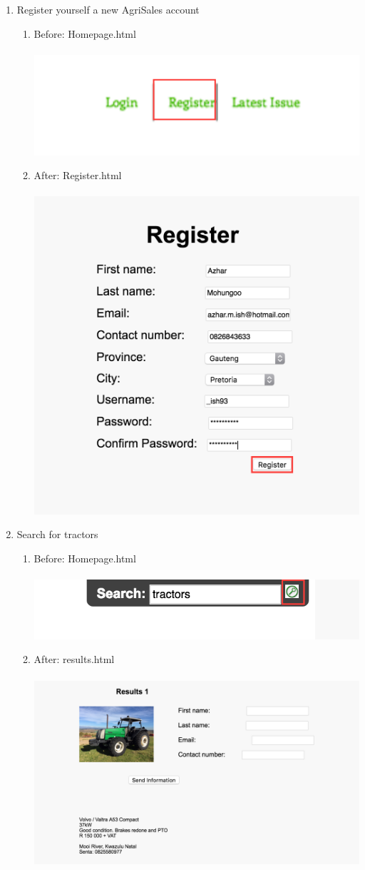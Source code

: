 \documentclass[11pt]{article}
\begin{document}
\begin{enumerate}
\begin{enumerate}
			\end{enumerate} \newpage
		\item Register yourself a new AgriSales account
			\begin{enumerate}
				\item Before: Homepage.html \\ \\
					\includegraphics[width=0.7\linewidth]{../Images/Tasks/Task3Before}
				\item After: Register.html \\ \\
					\includegraphics[width=0.5\linewidth]{../Images/Tasks/Task3After}
			\end{enumerate}
		\item Search for tractors
			\begin{enumerate}
				\item Before: Homepage.html \\ \\
					\includegraphics[width=0.8\linewidth]{../Images/Tasks/Task4Before}
				\item After: results.html \\ \\
					\includegraphics[width=0.5\linewidth]{../Images/Tasks/Task4After}

\end{enumerate}
\end{enumerate}
\end{document}
